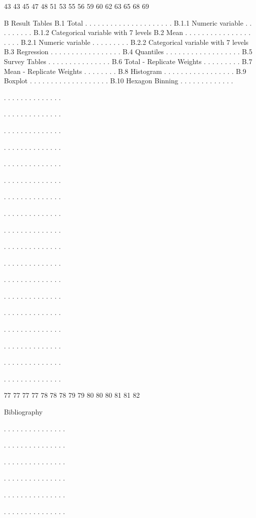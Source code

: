 43
43
45
47
48
51
53
55
56
59
60
62
63
65
68
69

B Result Tables
B.1 Total . . . . . . . . . . . . . . . . . . . . .
B.1.1 Numeric variable . . . . . . . . .
B.1.2 Categorical variable with 7 levels
B.2 Mean . . . . . . . . . . . . . . . . . . . .
B.2.1 Numeric variable . . . . . . . . .
B.2.2 Categorical variable with 7 levels
B.3 Regression . . . . . . . . . . . . . . . . .
B.4 Quantiles . . . . . . . . . . . . . . . . . .
B.5 Survey Tables . . . . . . . . . . . . . . .
B.6 Total - Replicate Weights . . . . . . . . .
B.7 Mean - Replicate Weights . . . . . . . .
B.8 Histogram . . . . . . . . . . . . . . . . .
B.9 Boxplot . . . . . . . . . . . . . . . . . . .
B.10 Hexagon Binning . . . . . . . . . . . . .

.
.
.
.
.
.
.
.
.
.
.
.
.
.

.
.
.
.
.
.
.
.
.
.
.
.
.
.

.
.
.
.
.
.
.
.
.
.
.
.
.
.

.
.
.
.
.
.
.
.
.
.
.
.
.
.

.
.
.
.
.
.
.
.
.
.
.
.
.
.

.
.
.
.
.
.
.
.
.
.
.
.
.
.

.
.
.
.
.
.
.
.
.
.
.
.
.
.

.
.
.
.
.
.
.
.
.
.
.
.
.
.

.
.
.
.
.
.
.
.
.
.
.
.
.
.

.
.
.
.
.
.
.
.
.
.
.
.
.
.

.
.
.
.
.
.
.
.
.
.
.
.
.
.

.
.
.
.
.
.
.
.
.
.
.
.
.
.

.
.
.
.
.
.
.
.
.
.
.
.
.
.

.
.
.
.
.
.
.
.
.
.
.
.
.
.

.
.
.
.
.
.
.
.
.
.
.
.
.
.

.
.
.
.
.
.
.
.
.
.
.
.
.
.

.
.
.
.
.
.
.
.
.
.
.
.
.
.

.
.
.
.
.
.
.
.
.
.
.
.
.
.

77
77
77
77
78
78
78
79
79
80
80
80
81
81
82

Bibliography

.
.
.
.
.
.
.
.
.
.
.
.
.
.
.

.
.
.
.
.
.
.
.
.
.
.
.
.
.
.

.
.
.
.
.
.
.
.
.
.
.
.
.
.
.

.
.
.
.
.
.
.
.
.
.
.
.
.
.
.

.
.
.
.
.
.
.
.
.
.
.
.
.
.
.

.
.
.
.
.
.
.
.
.
.
.
.
.
.
.

